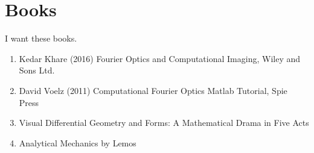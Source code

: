 \documentclass[../../main.tex]{subfiles} %
\begin{document}
\chapter{Books}
I want these books. 

\begin{enumerate}
    \item Kedar Khare (2016) Fourier Optics and Computational Imaging, Wiley and Sons Ltd.
    \item David Voelz (2011) Computational Fourier Optics Matlab Tutorial, Spie Press
    \item Visual Differential Geometry and Forms: A Mathematical Drama in Five Acts
    \item Analytical Mechanics by Lemos
\end{enumerate}
\end{document}
